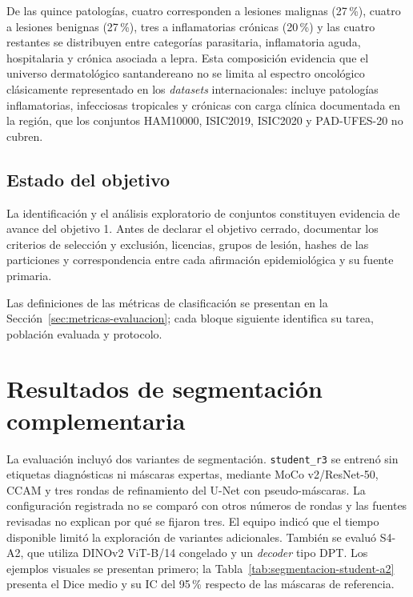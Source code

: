 De las quince patologías, cuatro corresponden a lesiones malignas (27\,\%), cuatro a lesiones benignas (27\,\%), tres a inflamatorias crónicas (20\,\%) y las cuatro restantes se distribuyen entre categorías parasitaria, inflamatoria aguda, hospitalaria y crónica asociada a lepra. Esta composición evidencia que el universo dermatológico santandereano no se limita al espectro oncológico clásicamente representado en los \textit{datasets} internacionales: incluye patologías inflamatorias, infecciosas tropicales y crónicas con carga clínica documentada en la región, que los conjuntos HAM10000, ISIC2019, ISIC2020 y PAD-UFES-20 no cubren.

\subsection{Estado del objetivo}

La identificación y el análisis exploratorio de conjuntos constituyen evidencia de avance del objetivo 1. Antes de declarar el objetivo cerrado, documentar los criterios de selección y exclusión, licencias, grupos de lesión, hashes de las particiones y correspondencia entre cada afirmación epidemiológica y su fuente primaria.




Las definiciones de las métricas de clasificación se presentan en la Sección~\ref{sec:metricas-evaluacion}; cada bloque siguiente identifica su tarea, población evaluada y protocolo.

\section{Resultados de segmentación complementaria}
\label{sec:segmentacion-complementaria}

La evaluación incluyó dos variantes de segmentación. \texttt{student\_r3} se entrenó sin etiquetas diagnósticas ni máscaras expertas, mediante MoCo v2/ResNet-50, CCAM y tres rondas de refinamiento del U-Net con pseudo-máscaras. La configuración registrada no se comparó con otros números de rondas y las fuentes revisadas no explican por qué se fijaron tres. El equipo indicó que el tiempo disponible limitó la exploración de variantes adicionales. También se evaluó S4-A2, que utiliza DINOv2 ViT-B/14 congelado y un \textit{decoder} tipo DPT. Los ejemplos visuales se presentan primero; la Tabla~\ref{tab:segmentacion-student-a2} presenta el Dice medio y su IC del 95\,\% respecto de las máscaras de referencia.

